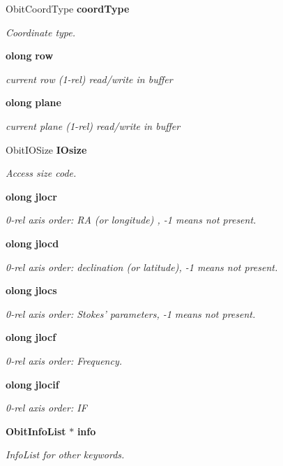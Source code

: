 \begin{CompactItemize}
Obit\-Coord\-Type {\bf coord\-Type}
\begin{CompactList}\small\item\em Coordinate type. \item\end{CompactList}\item 
{\bf olong} {\bf row}
\begin{CompactList}\small\item\em current row (1-rel) read/write in buffer \item\end{CompactList}\item 
{\bf olong} {\bf plane}
\begin{CompactList}\small\item\em current plane (1-rel) read/write in buffer \item\end{CompactList}\item 
Obit\-IOSize {\bf IOsize}
\begin{CompactList}\small\item\em Access size code. \item\end{CompactList}\item 
{\bf olong} {\bf jlocr}
\begin{CompactList}\small\item\em 0-rel axis order: RA (or longitude) , -1 means not present. \item\end{CompactList}\item 
{\bf olong} {\bf jlocd}
\begin{CompactList}\small\item\em 0-rel axis order: declination (or latitude), -1 means not present. \item\end{CompactList}\item 
{\bf olong} {\bf jlocs}
\begin{CompactList}\small\item\em 0-rel axis order: Stokes' parameters, -1 means not present. \item\end{CompactList}\item 
{\bf olong} {\bf jlocf}
\begin{CompactList}\small\item\em 0-rel axis order: Frequency. \item\end{CompactList}\item 
{\bf olong} {\bf jlocif}
\begin{CompactList}\small\item\em 0-rel axis order: IF \item\end{CompactList}\item 
{\bf Obit\-Info\-List} $\ast$ {\bf info}
\begin{CompactList}\small\item\em Info\-List for other keywords. \item\end{CompactList}\end{CompactItemize}


